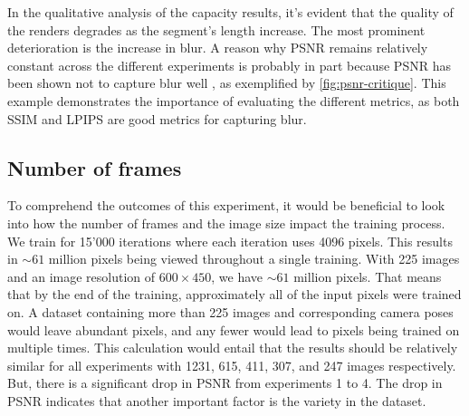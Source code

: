 In the qualitative analysis of the capacity results, it's evident that the quality of the renders degrades as the segment's length increase. The most prominent deterioration is the increase in blur. A reason why PSNR remains relatively constant across the different experiments is probably in part because PSNR has been shown not to capture blur well \cite{videoprocessingai}, as exemplified by \autoref{fig:psnr-critique}. This example demonstrates the importance of evaluating the different metrics, as both SSIM and LPIPS are good metrics for capturing blur.



















\subsection{Number of frames}


To comprehend the outcomes of this experiment, it would be beneficial to look into how the number of frames and the image size impact the training process. We train for 15'000 iterations where each iteration uses 4096 pixels. This results in $\sim61$ million pixels being viewed throughout a single training. With 225 images and an image resolution of $600 \times 450$, we have $\sim61$ million pixels. That means that by the end of the training, approximately all of the input pixels were trained on. A dataset containing more than 225 images and corresponding camera poses would leave abundant pixels, and any fewer would lead to pixels being trained on multiple times. This calculation would entail that the results should be relatively similar for all experiments with 1231, 615, 411, 307, and 247 images respectively. But, there is a significant drop in PSNR from experiments 1 to 4. The drop in PSNR indicates that another important factor is the variety in the dataset.














